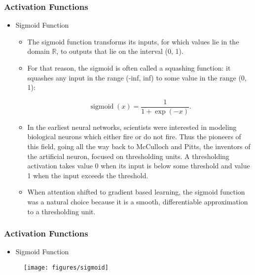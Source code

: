 \documentclass[
  shownotes,
  xcolor={svgnames},
  hyperref={colorlinks,citecolor=DarkBlue,linkcolor=DarkRed,urlcolor=DarkBlue}
  , aspectratio=169]{beamer}
\begin{document}
\begin{frame}
\frametitle{Activation Functions}





\begin{itemize}

\item Sigmoid Function

\begin{itemize}



\item The sigmoid function transforms its inputs, for which values lie in the domain $\mathbb{R}$, to outputs that lie on the interval (0, 1). 
\item For that reason, the sigmoid is often called a squashing function: it squashes any input in the range (-inf, inf) to some value in the range (0, 1):

$$\operatorname{sigmoid}(x) = \frac{1}{1 + \exp(-x)}.$$

\item In the earliest neural networks, scientists were interested in modeling biological neurons which either fire or do not fire. Thus the pioneers of this field, going all the way back to McCulloch and Pitts, the inventors of the artificial neuron, focused on thresholding units. A thresholding activation takes value 0 when its input is below some threshold and value 1 when the input exceeds the threshold.

\item When attention shifted to gradient based learning, the sigmoid function was a natural choice because it is a smooth, differentiable approximation to a thresholding unit. 

    \end{itemize}
\end{itemize}    



\end{frame}
\begin{frame}
\frametitle{Activation Functions}




\begin{itemize}

\item Sigmoid Function

\end{itemize}

  \begin{figure}[H] \centering
            \captionsetup{justification=centering}
              \texttt{[image: figures/sigmoid]}
              
 \end{figure}

\end{frame}
\end{document}
